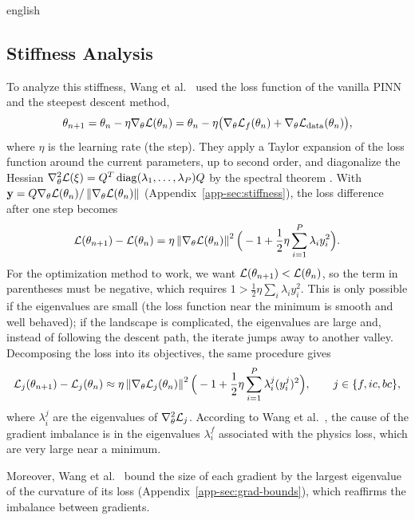\documentclass[../0000.tex]{subfiles}
\begin{document}
\begin{hyphenrules}{english}
\subsection{Stiffness Analysis}

To analyze this stiffness, Wang et al.~\cite{wang2021gradient} used the loss function of the vanilla PINN and
the steepest descent method,
\begin{equation}
  \theta_{n+1}=\theta_n-\eta\nabla_\theta\mathcal{L}(\theta_n)=\theta_n-\eta\big(\nabla_\theta\mathcal{L}_f(\theta_n)+\nabla_\theta\mathcal{L}_{\mathrm{data}}(\theta_n)\big),
  \label{eq:gd}
\end{equation}
where $\eta$ is the learning rate (the step). They apply a Taylor expansion of the loss function around the current parameters, up to second order,
and diagonalize the Hessian $\nabla^2_\theta\mathcal{L}(\xi)=Q^{T}\operatorname{diag}(\lambda_1,\dots,\lambda_P)Q$ by the
spectral theorem \cite{trefethen1997}. With $\mathbf{y}=Q\nabla_\theta\mathcal{L}(\theta_n)/\left\lVert \nabla_\theta\mathcal{L}(\theta_n) \right\rVert$
(Appendix~\ref{app-sec:stiffness}), the loss difference after one step becomes
\begin{equation}
  \mathcal{L}(\theta_{n+1})-\mathcal{L}(\theta_n)=\eta\left\lVert \nabla_\theta\mathcal{L}(\theta_n) \right\rVert^2
  \Big(-1+\frac12\eta\sum_{i=1}^{P}\lambda_iy_i^2\Big).
  \label{eq:stiffness}
\end{equation}
For the optimization method to work, we want $\mathcal{L}(\theta_{n+1})<\mathcal{L}(\theta_n)$, so the term in
parentheses must be negative, which requires $1>\frac12\eta\sum_i\lambda_iy_i^2$. This is only possible if
the eigenvalues are small (the loss function near the minimum is smooth and well behaved); if the
landscape is complicated, the eigenvalues are large and, instead of following the descent path, the
iterate jumps away to another valley. Decomposing the loss into its objectives, the same procedure gives
\begin{equation}
  \mathcal{L}_j(\theta_{n+1})-\mathcal{L}_j(\theta_n)\approx\eta\left\lVert \nabla_\theta\mathcal{L}_j(\theta_n) \right\rVert^2
  \Big(-1+\frac12\eta\sum_{i=1}^{P}\lambda^{j}_i(y^{j}_i)^2\Big),\qquad j\in\{f,ic,bc\},
  \label{eq:stiffness-split}
\end{equation}
where $\lambda^{j}_i$ are the eigenvalues of $\nabla^2_\theta\mathcal{L}_j$. According to
Wang et al.~\cite{wang2021gradient}, the cause of the gradient imbalance is in the eigenvalues $\lambda^{f}_i$
associated with the physics loss, which are very large near a minimum.

Moreover, Wang et al.~\cite{wang2021gradient} bound the size of each gradient by the largest eigenvalue of
the curvature of its loss (Appendix~\ref{app-sec:grad-bounds}), which reaffirms the imbalance between
gradients.


\end{hyphenrules}
\end{document}
